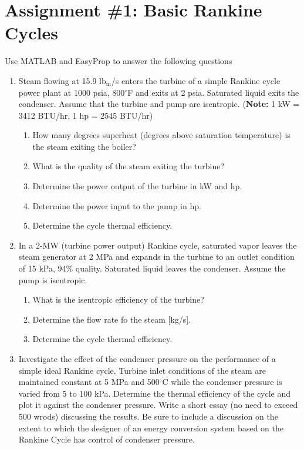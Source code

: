 \chapter{Assignment \#1: Basic Rankine Cycles}
\label{ch:ass1}

Use MATLAB and EasyProp to answer the following questions
\begin{fullwidth}
\begin{enumerate}
\item Steam flowing at 15.9 lb$_{\text{m}}$/s enters the turbine of a simple Rankine cycle power plant at 1000 psia, 800$^{\circ}$F and exits at 2 psia.  Saturated liquid exits the condenser.  Assume that the turbine and pump are isentropic. (\textbf{Note:} 1 kW = 3412 BTU/hr, 1 hp = 2545 BTU/hr)
\begin{enumerate}
\item How many degrees superheat (degrees above saturation temperature) is the steam exiting the boiler?
\item What is the quality of the steam exiting the turbine?
\item Determine the power output of the turbine in kW and hp.
\item Determine the power input to the pump in hp.
\item Determine the cycle thermal efficiency.
\end{enumerate}

\vspace{1.0cm}

\item In a 2-MW (turbine power output) Rankine cycle, saturated vapor leaves the steam generator at 2 MPa and expands in the turbine to an outlet condition of 15 kPa, 94\% quality.  Saturated liquid leaves the condenser.  Assume the pump is isentropic.
\begin{enumerate}
\item What is the isentropic efficiency of the turbine?
\item Determine the flow rate fo the steam [kg/s].
\item Determine the cycle thermal efficiency.
\end{enumerate}

\vspace{1.0cm}
\item Investigate the effect of the condenser pressure on the performance of a simple ideal Rankine cycle.  Turbine inlet conditions of the steam are maintained constant at 5 MPa and 500$^{\circ}$C while the condenser pressure is varied from 5 to 100 kPa.  Determine the thermal efficiency of the cycle and plot it against the condenser pressure.  Write a short essay (no need to exceed 500 wrods) discussing the results.  Be sure to include a discussion on the extent to which the designer of an energy conversion system based on the Rankine Cycle has control of condenser pressure.

\end{enumerate}
\end{fullwidth}
